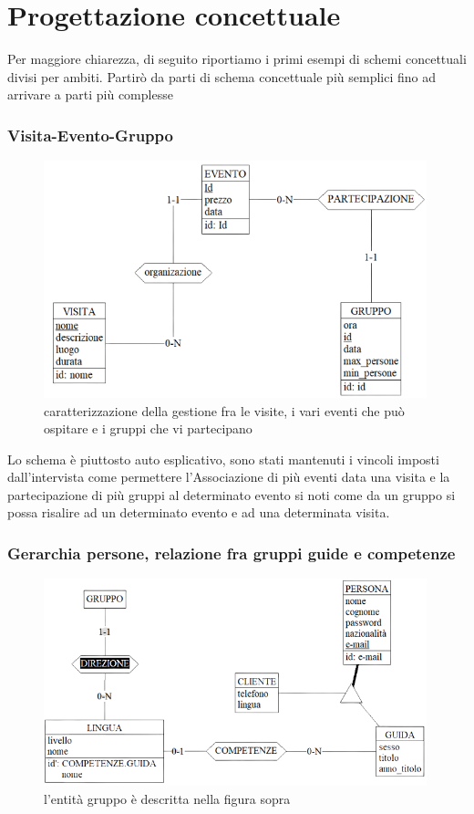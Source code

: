 \documentclass[a4paper,12pt]{report}
\begin{document}
\chapter{Progettazione concettuale}
Per maggiore chiarezza, di seguito riportiamo i primi esempi di schemi concettuali
divisi per ambiti. Partirò da parti di schema concettuale più semplici fino ad arrivare a parti più complesse
\subsection*{Visita-Evento-Gruppo}
\begin{figure}[H]
    \centering
    \includegraphics[width=0.99\textwidth]{evento-visita-gruppo.png}
    \caption[]{caratterizzazione della gestione fra le visite, i vari eventi che può ospitare e i gruppi che vi partecipano}
\end{figure}
Lo schema è piuttosto auto esplicativo, sono stati mantenuti i vincoli imposti
dall'intervista come permettere l'Associazione di più eventi data una visita e
la partecipazione di più gruppi al determinato evento si noti come da un gruppo
si possa risalire ad un determinato evento e ad una determinata visita.
\subsection*{Gerarchia persone, relazione fra gruppi guide e competenze}
\begin{figure}[H]
    \centering
    \includegraphics[width=0.99\textwidth]{gruppo-guide.png}
    \caption[]{l'entità gruppo è descritta nella figura sopra}
\end{figure}
\end{document}
